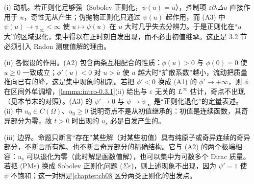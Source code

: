 \documentclass[../main.tex]{subfiles}
\begin{document}
\begin{remark}\label{remark:intro-0.3.3-动机}
(i) 动机。若正则化足够强（Sobolev 正则化，$\psi(u)=u$），控制项 $\varepsilon\partial_t\Delta u$ 直接作用于 $u$，奇性无从产生；伪抛物正则化只通过 $\psi(u)$ 起作用，而 (A3) 中 $\psi(u)\to\psi_\infty<\infty$ 使 $u\mapsto\psi(u)$ 在 $u$ 大时几乎失去分辨力。于是正则化在“$u$ 大”的区域退化，集中得以在正时刻自发出现，而不必由初值继承。这正是 3.2 节必须引入 Radon 测度值解的理由。

(ii) 各假设的作用。(A2) 包含两条互相配合的性质：$\phi(u)>0$ 与 $\phi(0)=0$ 使 $u\geqslant0$ 一致成立；$\phi'(u)<0$ 对 $u>\bar u$ 使 $u$ 越大时“扩散系数”越小，流动把质量推向已有的峰，这是集中现象的机制。若把 $\phi'<0$ 换成 (A1) 的 $\phi'\to+\infty$，则 $\phi$ 在区间外单调增，\cref{lemma:intro-0.3.1}(ii) 给出与 $\varepsilon$ 无关的 $L^\infty$ 估计，奇点不出现（见本节末的对照）。(A3) 的 $\psi'\to0$ 与 $\psi\to\psi_\infty$ 是“正则化退化”的定量表述。(ii) 中 $u_0\in C(\Omega)$、$u_0\geqslant0$ 说明奇点不是从初值继承的：初值是连续函数，其奇异部分为零，故 $t>0$ 时出现的 $u_s$ 必是自发产生的。

(iii) 边界。命题只断言“存在”某些解（对某些初值）具有纯原子或奇异连续的奇异部分，不断言所有解、也不断言奇异部分的精确结构。它与 (A2) 的两个极端相容：$u_s$ 可以退化为零（此时解是函数值解），也可以集中为可数多个 Dirac 质量。若把 (PM$\varepsilon$) 换成 Sobolev 正则化问题 ($\Sigma\varepsilon$)，则上述现象不出现，因为 $\psi'=1$ 使 $\psi$ 不饱和；这一对照是\cref{chapter:ch08}区分两类正则化的出发点。
\end{remark}
\end{document}
